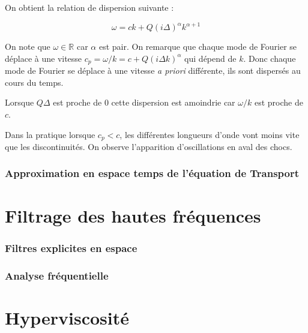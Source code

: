 \documentclass[10pt,a4paper]{amsart}
\begin{document}
On obtient la relation de dispersion suivante :

\begin{equation}
\omega = ck + Q \left( i \Delta \right)^{\alpha} k^{\alpha +1}
\end{equation}

On note que $\omega \in \mathbb{R}$ car $\alpha$ est pair. On remarque que chaque mode de Fourier se déplace à une vitesse $c_p = \omega / k = c + Q \left( i \Delta k \right)^{\alpha}$ qui dépend de $k$. Donc chaque mode de Fourier se déplace à une vitesse \textit{a priori} différente, ils sont dispersés au cours du temps.

Lorsque $Q \Delta$ est proche de $0$ cette dispersion est amoindrie car $\omega / k$ est proche de $c$.

Dans la pratique lorsque $c_p < c$, les différentes longueurs d'onde vont moins vite que les discontinuités. On observe l'apparition d'oscillations en aval des chocs.

\section{Approximation en espace temps de l'équation de Transport}


%
%

\part{Filtrage des hautes fréquences}

\section{Filtres explicites en espace}

\section{Analyse fréquentielle}



%
%

\part{Hyperviscosité}
\end{document}
